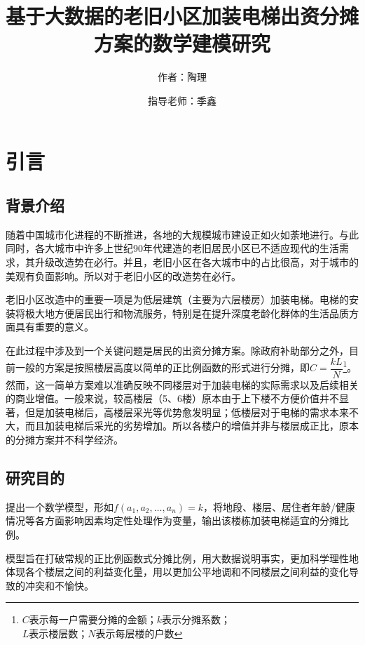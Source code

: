 \documentclass[lang=cn,a4paper]{elegantpaper}
\title{基于大数据的老旧小区加装电梯出资分摊方案的数学建模研究}
\author{作者：陶理 \and 指导老师：季鑫}
\institute{上海市实验学校}
\date{\zhtoday}
\begin{document}
    \maketitle
    
    \begin{abstract}
    \end{abstract}

    \section{引言}

    \subsection{背景介绍}

    随着中国城市化进程的不断推进，各地的大规模城市建设正如火如荼地进行。与此同时，各大城市中许多上世纪90年代建造的老旧居民小区已不适应现代的生活需求，其升级改造势在必行。并且，老旧小区在各大城市中的占比很高\cite{research.ke}，对于城市的美观有负面影响。所以对于老旧小区的改造势在必行。
    
    老旧小区改造中的重要一项是为低层建筑（主要为六层楼房）加装电梯。电梯的安装将极大地方便居民出行和物流服务，特别是在提升深度老龄化群体的生活品质方面具有重要的意义。
    
    在此过程中涉及到一个关键问题是居民的出资分摊方案。除政府补助部分之外，目前一般的方案是按照楼层高度以简单的正比例函数的形式进行分摊，即$C=\dfrac{kL}{N}$\footnote{$C$表示每一户需要分摊的金额；$k$表示分摊系数；\\$L$表示楼层数；$N$表示每层楼的户数}。然而，这一简单方案难以准确反映不同楼层对于加装电梯的实际需求以及后续相关的商业增值。一般来说，较高楼层（5、6楼）原本由于上下楼不方便价值并不显著，但是加装电梯后，高楼层采光等优势愈发明显；低楼层对于电梯的需求本来不大，而且加装电梯后采光的劣势增加。所以各楼户的增值并非与楼层成正比，原本的分摊方案并不科学经济。
    
    \subsection{研究目的}
    提出一个数学模型，形如$f(a_1,a_2,\dots,a_n)=k$，将地段、楼层、居住者年龄/健康情况等各方面影响因素均定性处理作为变量，输出该楼栋加装电梯适宜的分摊比例。

    模型旨在打破常规的正比例函数式分摊比例，用大数据说明事实，更加科学理性地体现各个楼层之间的利益变化量，用以更加公平地调和不同楼层之间利益的变化导致的冲突和不愉快。
\end{document}
